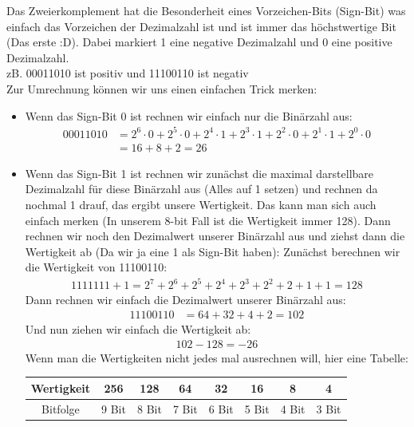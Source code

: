 \documentclass[12pt]{article}
\begin{document}
\begin{flushleft}
    Das Zweierkomplement hat die Besonderheit eines Vorzeichen-Bits (Sign-Bit) was einfach das Vorzeichen der Dezimalzahl ist und ist immer das höchstwertige Bit (Das erste :D).
    Dabei markiert 1 eine negative Dezimalzahl und 0 eine positive Dezimalzahl. \\
    zB. 00011010 ist positiv und 11100110 ist negativ \\
    \vspace{0.5cm}
    Zur Umrechnung können wir uns einen einfachen Trick merken:
    \begin{itemize}
        \item Wenn das Sign-Bit 0 ist rechnen wir einfach nur die Binärzahl aus:
        \begin{align*}
            00011010 &= 2^6 \cdot 0 + 2^5 \cdot 0 + 2^4 \cdot 1 + 2^3 \cdot 1 + 2^2 \cdot 0 + 2^1 \cdot 1 + 2^0 \cdot 0 \\
            &= 16 + 8 + 2 = 26
        \end{align*}
        \item Wenn das Sign-Bit 1 ist rechnen wir zunächst die maximal darstellbare Dezimalzahl für diese Binärzahl aus (Alles auf 1 setzen) 
        und rechnen da nochmal 1 drauf, das ergibt unsere Wertigkeit. 
        Das kann man sich auch einfach merken (In unserem 8-bit Fall ist die Wertigkeit immer 128). 
        Dann rechnen wir noch den Dezimalwert unserer Binärzahl aus und ziehst dann die Wertigkeit ab (Da wir ja eine 1 als Sign-Bit haben): \linebreak
        \linebreak Zunächst berechnen wir die Wertigkeit von 11100110:
        \begin{align*}
            1111111 + 1 = 2^7 + 2^6 + 2^5 + 2^4 + 2^3 + 2^2 + 2 + 1 + 1 = 128
        \end{align*}
        Dann rechnen wir einfach die Dezimalwert unserer Binärzahl aus:
        \begin{align*}
            11100110 &= 64 + 32 + 4 + 2 = 102
        \end{align*}
        Und nun ziehen wir einfach die Wertigkeit ab:
        \begin{align*}
            102 - 128 = -26
        \end{align*}
        Wenn man die Wertigkeiten nicht jedes mal ausrechnen will, 
        hier eine Tabelle: \linebreak \linebreak
        \begin{tabular}{|c|c|c|c|c|c|c|c|}
            \hline
            Wertigkeit & 256 & 128 & 64 & 32 & 16 & 8 & 4 \\
            \hline
            Bitfolge & 9 Bit & 8 Bit & 7 Bit & 6 Bit & 5 Bit  & 4 Bit & 3 Bit \\
            \hline
        \end{tabular}
    \end{itemize}
\end{flushleft}
\end{document}
